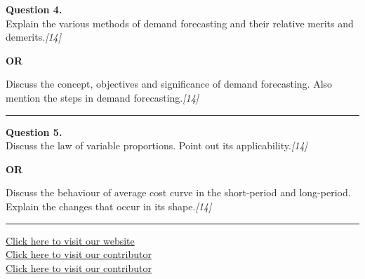 \documentclass[11pt,a4paper]{article}
\newcommand{\pts}[1]{\hfill   \textit{[#1]}}
\begin{document}
\noindent   \textbf{Question 4.} \\
Explain the various methods of demand forecasting and their relative merits and demerits.\pts{14}

\centerline{   \textbf{OR}}

Discuss the concept, objectives and significance of demand forecasting. Also mention the steps in demand forecasting.\pts{14}

\medskip\rule{\linewidth}{0.2pt}




\noindent   \textbf{Question 5.} \\
Discuss the law of variable proportions. Point out its applicability.\pts{14}

\centerline{   \textbf{OR}}

Discuss the behaviour of average cost curve in the short-period and long-period. Explain the changes that occur in its shape.\pts{14}

\vfill
\rule{\linewidth}{0.4pt}

\begin{center}\small
  \href{https://bhu-exam.vercel.app/}{Click here to visit our website}\\[4pt]
  \href{https://me-aryan.vercel.app/}{Click here to visit our contributor}\\[4pt]
  \href{https://quashan-me.vercel.app/}{Click here to visit our contributor}
\end{center}
\end{document}

